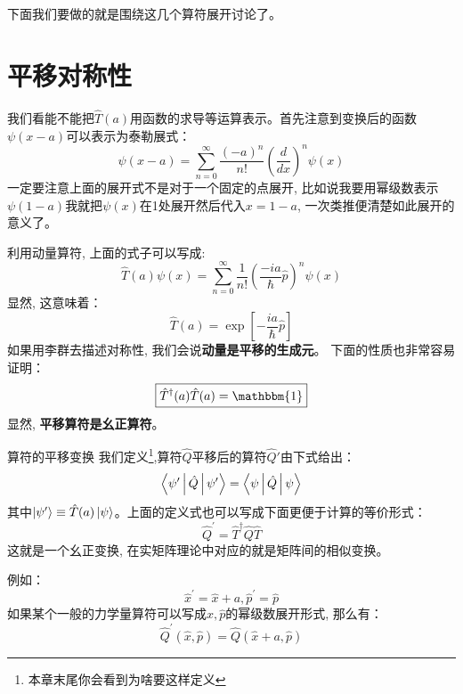 下面我们要做的就是围绕这几个算符展开讨论了。
\section{平移对称性}
我们看能不能把$\hat{T}(a)$用函数的求导等运算表示。首先注意到变换后的函数$\psi(x-a)$可以表示为泰勒展式：
\begin{equation}
    \label{eq:6.5}
    \psi(x-a)=\sum_{n=0}^\infty \frac{(-a)^n}{n!}\left(\frac{d}{dx}\right)^n\psi(x)
\end{equation}
一定要注意上面的展开式不是对于一个固定的点展开, 比如说我要用幂级数表示$\psi(1-a)$我就把$\psi(x)$在1处展开然后代入$x=1-a$, 一次类推便清楚如此展开的意义了。  

利用动量算符, 上面的式子可以写成:
\begin{equation}
    \hat{T}(a)\psi(x)=\sum_{n=0}^{\infty} \frac{1}{n !}\left(\frac{-i a}{\hbar} \hat{p}\right)^{n} \psi(x)
\end{equation}
显然, 这意味着：
\begin{equation}
    \boxed{
        \hat{T}(a)=\exp \left[-\frac{i a}{\hbar} \hat{p}\right]
    }
\end{equation}
如果用李群去描述对称性, 我们会说\textbf{动量是平移的生成元}。
下面的性质也非常容易证明：
\begin{equation}
    \boxed{\hat{T}^\dagger(a)\hat{T}(a)=\mathbbm{1}}
\end{equation}
显然, \textbf{平移算符是幺正算符}。
\begin{define}{算符的平移变换}
    我们定义\footnote{本章末尾你会看到为啥要这样定义},算符$\hat{Q}$平移后的算符$\hat{Q}\prime$由下式给出：
    \begin{equation}
        \Braket{\psi^\prime|\hat Q|\psi^\prime}=\Braket{\psi|\hat Q|\psi}
    \end{equation}
    其中$\ket{\psi^\prime}\equiv\hat{T}(a)\ket{\psi}$。上面的定义式也可以写成下面更便于计算的等价形式：
    \begin{equation}
        \boxed{\hat{Q}^{\prime}=\hat{T}^{\dagger} \hat{Q} \hat{T}}
    \end{equation}
    这就是一个幺正变换, 在实矩阵理论中对应的就是矩阵间的相似变换。
\end{define}
例如：
$$\hat{x}^\prime=\hat x +a,\hat{p}^\prime=\hat{p}$$
如果某个一般的力学量算符可以写成$\hat{x},\hat{p}$的幂级数展开形式, 那么有：
\begin{equation}
    \label{eq:6.11}
    \hat{Q}^\prime(\hat x,\hat p)=\hat{Q}(\hat x+a,\hat p)
\end{equation}

